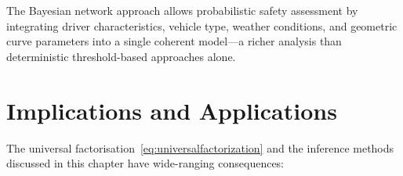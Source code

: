 The Bayesian network approach allows probabilistic safety assessment by
integrating driver characteristics, vehicle type, weather conditions, and
geometric curve parameters into a single coherent model---a richer analysis
than deterministic threshold-based approaches alone.

\section{Implications and Applications}\label{sec:implications}

The universal factorisation~\eqref{eq:universalfactorization} and the
inference methods discussed in this chapter have wide-ranging consequences:

